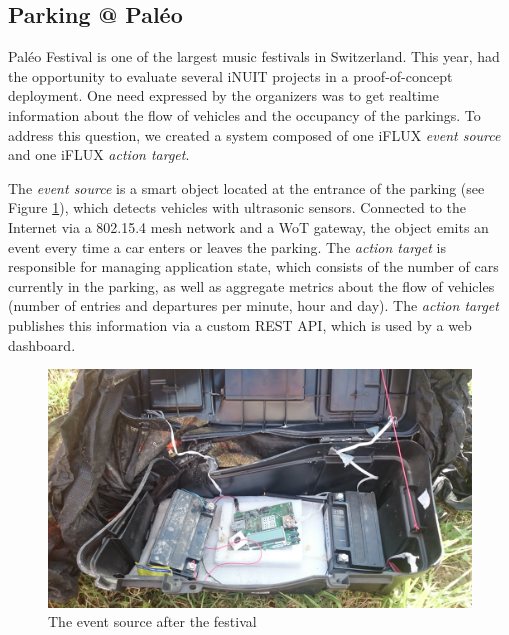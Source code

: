 

\subsection{Parking @ Paléo}

Paléo Festival is one of the largest music festivals in Switzerland. This year, had the opportunity to evaluate several iNUIT projects in a proof-of-concept deployment. One need expressed by the organizers was to get realtime information about the flow of vehicles and the occupancy of the parkings. To address this question, we created a system composed of one iFLUX \emph{event source} and one iFLUX \emph{action target}. 

The \emph{event source} is a smart object located at the entrance of the parking (see Figure \ref{fig:paleo}), which detects vehicles with ultrasonic sensors. Connected to the Internet via a 802.15.4 mesh network and a WoT gateway, the object emits an event every time a car enters or leaves the parking. The \emph{action target} is responsible for managing application state, which consists of the number of cars currently in the parking, as well as aggregate metrics about the flow of vehicles (number of entries and departures per minute, hour and day). The \emph{action target} publishes this information via a custom REST API, which is used by a web dashboard.

\begin{figure}
\centering
\includegraphics[width=0.85\columnwidth]{figures/paleo-after.png}
\caption{The event source after the festival}
\label{fig:paleo}
\end{figure}


